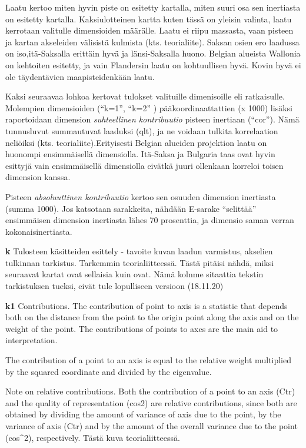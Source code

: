 \documentclass[
  finnish,
]{book}
\begin{document}
Laatu kertoo miten hyvin piste on esitetty kartalla, miten suuri osa sen
inertiasta on esitetty kartalla. Kaksiulotteinen kartta kuten tässä on yleisin
valinta, laatu kerrotaan valitulle dimensioiden määrälle. Laatu ei riipu massasta,
vaan pisteen ja kartan akseleiden välisistä kulmista (kts. teorialiite). Saksan
osien ero laadussa on iso,itä-Saksalla erittäin hyvä ja länsi-Saksalla huono.
Belgian alueista Wallonia on kehtoiten esitetty, ja vain Flandersin laatu on
kohtuullisen hyvä. Kovin hyvä ei ole täydentävien maapisteidenkään laatu.

Kaksi seuraavaa lohkoa kertovat tulokset valituille dimenisoille eli ratkaisulle.
Molempien dimensioiden (``k=1'', ``k=2'' ) pääkoordinaattattien (x 1000) lisäksi
raportoidaan dimension \emph{suhteellinen kontribuutio} pisteen inertiaan (``cor'').
Nämä tunnusluvut summautuvat laaduksi (qlt), ja ne voidaan tulkita korrelaation
neliöiksi (kts. teorialiite).Erityisesti Belgian alueiden projektion laatu on
huonompi ensimmäisellä dimensiolla. Itä-Saksa ja Bulgaria taas ovat hyvin esittyjä
vain ensimmäisellä dimensiolla eivätkä juuri ollenkaan korreloi toisen dimension
kanssa.

Pisteen \emph{absoluuttinen kontribuutio} kertoo sen osuuden dimension inertiasta
(summa 1000). Jos katsotaan sarakkeita, nähdään E-sarake ``selittää'' ensimmäisen
dimension inertiasta lähes 70 prosenttia, ja dimensio saman verran
kokonaisinertiasta.

\textbf{k} Tulosteen käsitteiden esittely - tavoite kuvan laadun varmistus, akselien
tulkinnan tarkistus. Tarkemmin teorialiitteessä. Tästä pitäisi nähdä, miksi seuraavat
kartat ovat sellaisia kuin ovat. Nämä kolnme sitaattia tekstin tarkistuksen tueksi,
eivät tule lopulliseen versioon (18.11.20)

\textbf{k1} Contributions. The contribution of point to axis is a statistic that depends
both on the distance from the point to the origin point along the axis and on
the weight of the point. The contributions of points to axes are the main aid to
interpretation.

The contribution of a point to an axis is equal to the relative weight
multiplied by the squared coordinate and divided by the eigenvalue.

Note on relative contributions.
Both the contribution of a point to an axis (Ctr) and the quality of
representation (cos2) are relative contributions, since both are obtained by
dividing the amount of variance of axis due to the point, by the variance of
axis (Ctr) and by the amount of the overall variance due to the point (cos\^{}2),
respectively. Tästä kuva teorialiitteessä.
\end{document}
